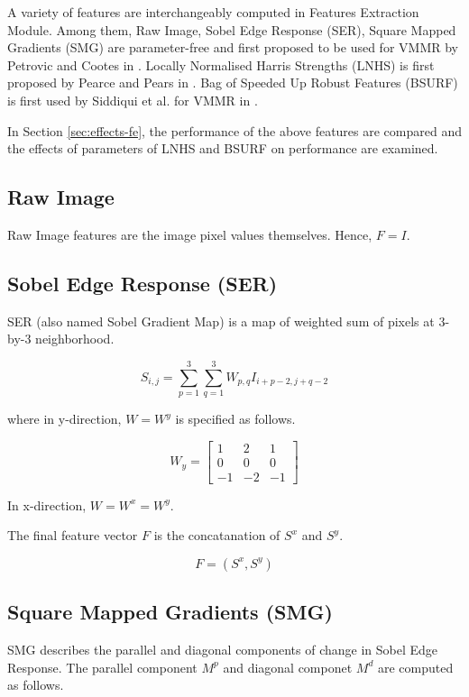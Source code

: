 A variety of features are interchangeably computed in Features Extraction Module.
Among them, Raw Image, Sobel Edge Response (SER), Square Mapped Gradients (SMG) are parameter-free and first proposed to be used for VMMR by Petrovic and Cootes in \citep{petrovic2004analysis}.
Locally Normalised Harris Strengths (LNHS) is first proposed by Pearce and Pears in \citep{pearce2011automatic}.
Bag of Speeded Up Robust Features (BSURF) is first used by Siddiqui et al. for VMMR in \citep{siddiqui2016real}.

In Section \ref{sec:effects-fe}, the performance of the above features are compared and the effects of parameters of LNHS and BSURF on performance are examined.

\subsection{Raw Image}
Raw Image features are the image pixel values themselves. Hence, $F = I$.


\subsection{Sobel Edge Response (SER)}
SER (also named Sobel Gradient Map) is a map of weighted sum of pixels at 3-by-3 neighborhood.

\begin{equation}
S_{i,j} = \sum_{p=1}^3 \sum_{q=1}^3 W_{p,q} I_{i+p-2,j+q-2}
\end{equation}

where in y-direction, $W=W^y$ is specified as follows.

\begin{equation}
W_y = 
\begin{bmatrix}
  1&  2&  1 \\
  0&  0&  0 \\
  -1& -2& -1 
\end{bmatrix}
\label{equ:w}
\end{equation}

In x-direction, $W = W^{x} = W^{y} $.

The final feature vector $F$ is the concatanation of $S^x$ and $S^y$.

\begin{equation}
F = (S^x, S^y)
\end{equation}

\subsection{Square Mapped Gradients (SMG)}
SMG describes the parallel and diagonal components of change in Sobel Edge Response.
The parallel component $M^p$ and diagonal componet $M^d$ are computed as follows.

